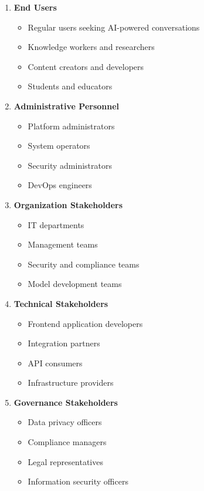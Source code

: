 \begin{enumerate}
   \item \textbf{End Users}
   \begin{itemize}
      \item Regular users seeking AI-powered conversations
      \item Knowledge workers and researchers
      \item Content creators and developers
      \item Students and educators
   \end{itemize}

   \item \textbf{Administrative Personnel}
   \begin{itemize}
      \item Platform administrators
      \item System operators
      \item Security administrators
      \item DevOps engineers
   \end{itemize}

   \item \textbf{Organization Stakeholders}
   \begin{itemize}
      \item IT departments
      \item Management teams
      \item Security and compliance teams
      \item Model development teams
   \end{itemize}

   \item \textbf{Technical Stakeholders}
   \begin{itemize}
      \item Frontend application developers
      \item Integration partners
      \item API consumers
      \item Infrastructure providers
   \end{itemize}

   \item \textbf{Governance Stakeholders}
   \begin{itemize}
      \item Data privacy officers
      \item Compliance managers
      \item Legal representatives
      \item Information security officers
   \end{itemize}
\end{enumerate}

